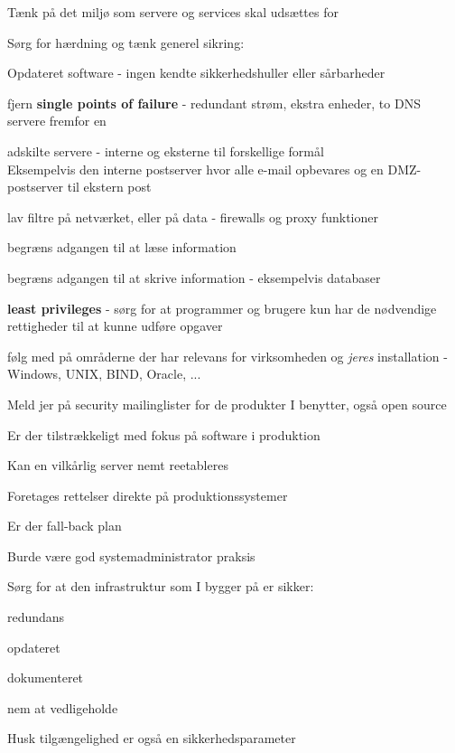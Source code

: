 \documentclass[Screen16to9,17pt]{foils}
\begin{document}
\begin{list1}
\item Tænk på det miljø som servere og services skal udsættes for
\item Sørg for hærdning og tænk generel sikring:
  \begin{list2}
  \item Opdateret software - ingen kendte sikkerhedshuller eller
  sårbarheder
\item fjern {\bfseries single points of failure} - redundant strøm, ekstra enheder, to DNS servere fremfor en
\item adskilte servere - interne og eksterne til forskellige formål\\
Eksempelvis den interne postserver hvor alle e-mail opbevares og en
DMZ-postserver til ekstern post
\item lav filtre på netværket, eller på data - firewalls og proxy
  funktioner
\item begræns adgangen til at læse information
\item begræns adgangen til at skrive information - eksempelvis databaser
\item {\bfseries least privileges} - sørg for at programmer og brugere
  kun har de nødvendige rettigheder til at kunne udføre opgaver
\item følg med på områderne der har relevans for virksomheden og
  \emph{jeres} installation - Windows, UNIX, BIND, Oracle, ...
  \end{list2}
  \item Meld jer på security mailinglister for de produkter I benytter, også open source
\end{list1}



\begin{list1}
\item Er der tilstrækkeligt med fokus på software i produktion
\item Kan en vilkårlig server nemt reetableres
\item Foretages rettelser direkte på produktionssystemer
\item Er der fall-back plan
\item Burde være god systemadministrator praksis
\end{list1}




\begin{list1}
\item Sørg for at den infrastruktur som I bygger på er sikker:
\begin{list2}
 \item redundans
       \item opdateret
        \item dokumenteret
        \item nem at vedligeholde
\end{list2}

\item  Husk tilgængelighed er også en sikkerhedsparameter
\end{list1}
\end{document}
